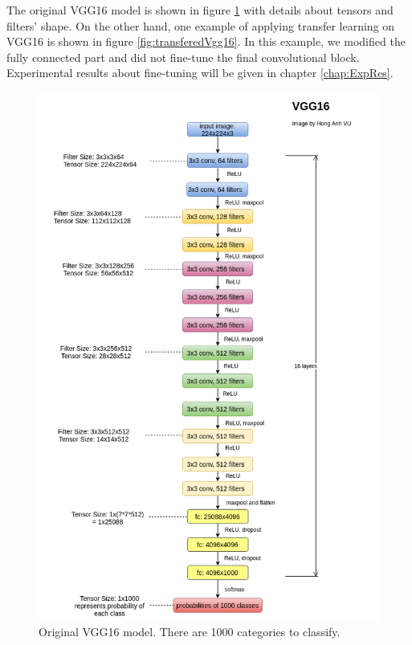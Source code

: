 The original VGG16 model is shown in figure \ref{fig:originalVgg16} with details about tensors and filters' shape. On the other hand, one example of applying transfer learning on VGG16 is shown in figure \ref{fig:transferedVgg16}. In this example, we modified the fully connected part and did not fine-tune the final convolutional block. Experimental results about fine-tuning will be given in chapter \ref{chap:ExpRes}.
\begin{figure}[tb]
	\centering
	\includegraphics[width=0.9\hsize]{./figures/originalVgg16}
	\caption{Original VGG16 model. There are 1000 categories to classify.}
	\label{fig:originalVgg16}
\end{figure}


